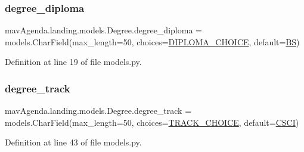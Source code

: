 \subsubsection{\texorpdfstring{degree\+\_\+diploma}{degree\_diploma}}
{\footnotesize\ttfamily mav\+Agenda.\+landing.\+models.\+Degree.\+degree\+\_\+diploma = models.\+Char\+Field(max\+\_\+length=50, choices=\mbox{\hyperlink{classmavAgenda_1_1landing_1_1models_1_1Degree_a3ff221c690ef27bb964e725770d3bc9f}{D\+I\+P\+L\+O\+M\+A\+\_\+\+C\+H\+O\+I\+CE}}, default=\mbox{\hyperlink{classmavAgenda_1_1landing_1_1models_1_1Degree_ac78267af5ecd7a08c46f236368bf0fff}{BS}})\hspace{0.3cm}{\ttfamily [static]}}



Definition at line 19 of file models.\+py.

\mbox{\label{classmavAgenda_1_1landing_1_1models_1_1Degree_a1c08e430a806acfa70e67afb8368ed15}} 
\subsubsection{\texorpdfstring{degree\+\_\+track}{degree\_track}}
{\footnotesize\ttfamily mav\+Agenda.\+landing.\+models.\+Degree.\+degree\+\_\+track = models.\+Char\+Field(max\+\_\+length=50, choices=\mbox{\hyperlink{classmavAgenda_1_1landing_1_1models_1_1Degree_a8f41a44472524786c537c409825c9946}{T\+R\+A\+C\+K\+\_\+\+C\+H\+O\+I\+CE}}, default=\mbox{\hyperlink{classmavAgenda_1_1landing_1_1models_1_1Degree_aa1c9040b53d9c37bfebe6ba1ecace359}{C\+S\+CI}})\hspace{0.3cm}{\ttfamily [static]}}



Definition at line 43 of file models.\+py.

\mbox{\label{classmavAgenda_1_1landing_1_1models_1_1Degree_ab2449e2bd027a88e4f33bdb6b51fbeee}} 
